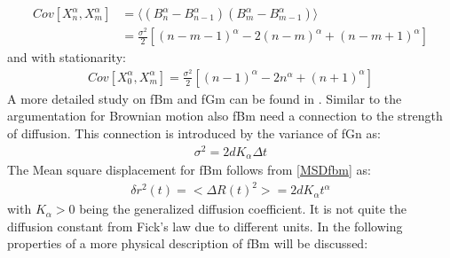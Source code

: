 \documentclass[
  a4paper,BCOR10mm,oneside,
  bibtotoc,idxtotoc,
  headsepline,footsepline,%
  fleqn,openbib
]{scrbook}
\begin{document}
\begin{align*}
 Cov[X^{\alpha}_n,X^{\alpha}_m]&=\langle (B^{\alpha}_n-B^{\alpha}_{n-1}) (B^{\alpha}_m-B^{\alpha}_{m-1})\rangle \\ &=\frac{\sigma^2}{2}[(n-m-1)^{\alpha}-2(n-m)^{\alpha}+(n-m+1)^{\alpha}]
\end{align*}
and with stationarity:
\begin{align}
 Cov[X^{\alpha}_0,X^{\alpha}_m]=\frac{\sigma^2}{2}[(n-1)^{\alpha}-2n^{\alpha}+(n+1)^{\alpha}]
\end{align}
A more detailed study on fBm and fGm can be found in \cite{qian2003fractional}. Similar to the argumentation for Brownian motion also fBm need a connection to the strength of diffusion. This connection is introduced by the variance of fGn as: 
\begin{align}
\label{diffusionvariance}
\sigma^2=2dK_{\alpha} \Delta t
\end{align}
The Mean square displacement for fBm follows from \cref{MSDfbm} as:
\begin{align}
\delta r^{2}(t)= < \Delta R(t)^2>=2dK_{\alpha} t^{\alpha}
\end{align}
with $K_{\alpha}>0$  being the generalized diffusion coefficient. It is not quite the diffusion constant from Fick's law due to different units.
\newline
In the following properties of a more physical description of fBm will be discussed:
\end{document}
